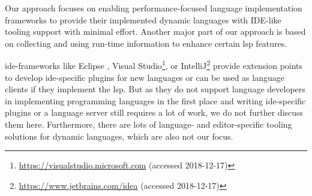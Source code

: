 \documentclass[sigplan,10pt,review,anonymous]{acmart}
\begin{document}

Our approach focuses on enabling performance-focused language implementation
frameworks to provide their implemented dynamic languages with IDE-like tooling
support with minimal effort. Another major part of our approach is based on
collecting and using run-time information to enhance certain \ac{lsp} features.


\ac{ide}-frameworks like Eclipse \cite{des2004eclipse}, Visual
Studio\footnote{\url{https://visualstudio.microsoft.com} (accessed 2018-12-17)},
or IntelliJ\footnote{\url{https://www.jetbrains.com/idea} (accessed 2018-12-17)}
provide extension points to develop \ac{ide}-specific plugins for new languages
or can be used as language clients if they implement the \ac{lsp}. But as they
do not support language developers in implementing programming languages in the
first place and writing \ac{ide}-specific plugins or a language server still
requires a lot of work, we do not further discuss them here. Furthermore, there
are lots of language- and editor-specific tooling solutions for dynamic
languages, which are also not our focus.
\end{document}
